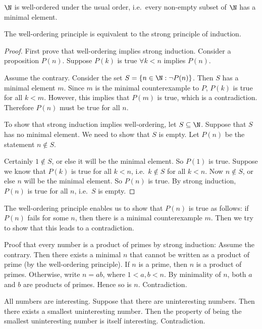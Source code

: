 \documentclass[a4paper]{article}
\begin{document}
\begin{thm}
  $\N$ is well-ordered under the usual order, i.e.\ every non-empty subset of $\N$ has a minimal element.
\end{thm}

\begin{thm}
  The well-ordering principle is equivalent to the strong principle of induction.
\end{thm}

\begin{proof}
  First prove that well-ordering implies strong induction. Consider a proposition $P(n)$. Suppose $P(k)$ is true $\forall k < n$ implies $P(n)$.

  Assume the contrary. Consider the set $S = \{n\in \N : \neg P(n)\}$. Then $S$ has a minimal element $m$. Since $m$ is the minimal counterexample to $P$, $P(k)$ is true for all $k < m$. However, this implies that $P(m)$ is true, which is a contradiction. Therefore $P(n)$ must be true for all $n$.

  To show that strong induction implies well-ordering, let $S\subseteq \N$. Suppose that $S$ has no minimal element. We need to show that $S$ is empty. Let $P(n)$ be the statement $n\not\in S$.

  Certainly $1\not\in S$, or else it will be the minimal element. So $P(1)$ is true. Suppose we know that $P(k)$ is true for all $k < n$, i.e.\ $k\not\in S$ for all $k < n$. Now $n\not\in S$, or else $n$ will be the minimal element. So $P(n)$ is true. By strong induction, $P(n)$ is true for all $n$, i.e.\ $S$ is empty.
\end{proof}
The well-ordering principle enables us to show that $P(n)$ is true as follows: if $P(n)$ fails for some $n$, then there is a minimal counterexample $m$. Then we try to show that this leads to a contradiction.

\begin{eg}
  Proof that every number is a product of primes by strong induction: Assume the contrary. Then there exists a minimal $n$ that cannot be written as a product of prime (by the well-ordering principle). If $n$ is a prime, then $n$ is a product of primes. Otherwise, write $n = ab$, where $1 < a, b < n$. By minimality of $n$, both $a$ and $b$ are products of primes. Hence so is $n$. Contradiction.
\end{eg}

\begin{eg}
  All numbers are interesting. Suppose that there are uninteresting numbers. Then there exists a smallest uninteresting number. Then the property of being the smallest uninteresting number is itself interesting. Contradiction.
\end{eg}
\end{document}
